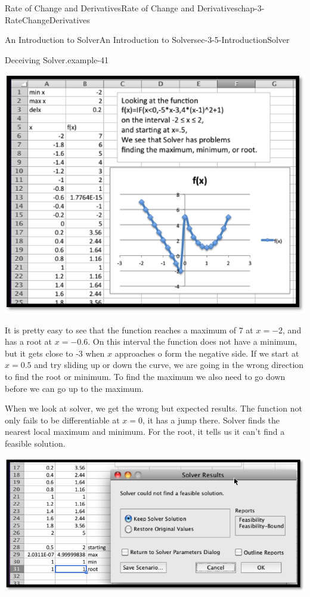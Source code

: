 \documentclass[oneside,10pt,]{book}
\numberwithin{equation}{section}
\begin{document}
\begin{chapterptx}{Rate of Change and Derivatives}{}{Rate of Change and Derivatives}{}{}{chap-3-RateChangeDerivatives}
\begin{sectionptx}{An Introduction to Solver}{}{An Introduction to Solver}{}{}{sec-3-5-IntroductionSolver}
\begin{example}{Deceiving Solver.}{example-41}
\begin{sidebyside}{1}{0.15}{0.15}{0}%
\begin{sbspanel}{0.7}%
\includegraphics[width=1\linewidth]{images/sec3-5-13.png}
\end{sbspanel}%
\end{sidebyside}%
\par
\hypertarget{p-1352}{}%
It is pretty easy to see that the function reaches a maximum of 7 at \(x=-2\), and has a root at \(x=-0.6\).  On this interval the function does not have a minimum, but it gets close to -3 when \(x\) approaches o form the negative side.  If we start at \(x=0.5\) and try sliding up or down the curve, we are going in the wrong direction to find the root or minimum.  To find the maximum we also need to go down before we can go up to the maximum.%
\par
\hypertarget{p-1353}{}%
When we look at solver, we get the wrong but expected results.  The function not only fails to be differentiable at \(x=0\), it has a jump there.  Solver finds the nearest local maximum and minimum.  For the root, it tells us it can’t find a feasible solution.%
\begin{sidebyside}{1}{0.15}{0.15}{0}%
\begin{sbspanel}{0.7}%
\includegraphics[width=1\linewidth]{images/sec3-5-14.png}

\end{sbspanel}
\end{sidebyside}
\end{example}
\end{sectionptx}
\end{chapterptx}
\end{document}
